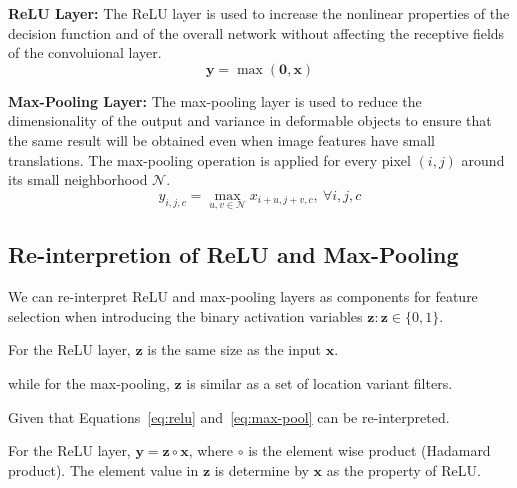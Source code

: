 \textbf{ReLU Layer:}
The ReLU layer is used to increase the nonlinear properties of the decision function and of the overall network without affecting the receptive fields of the convoluional layer.
\begin{equation}
\mathbf{y} = \max (\mathbf{0}, \mathbf{x})
\label{eq:relu}
\end{equation} 

\textbf{Max-Pooling Layer:}
The max-pooling layer is used to reduce the dimensionality of the output and variance in deformable objects to ensure that the same result will be obtained even when image features have small translations. The max-pooling operation is applied for every pixel $(i,j)$ around its small neighborhood $\mathcal{N}$.
\begin{equation}
y_{i,j,c} = \max_{u,v \in \mathcal{N}} x_{i+u, j+v, c},\ \forall i, j, c
\label{eq:max-pool}
\end{equation}

\subsection{Re-interpretion of ReLU and Max-Pooling}
We can re-interpret ReLU and max-pooling layers as components for feature selection when introducing the binary activation variables $\mathbf{z}: \mathbf{z} \in \{0, 1\}$. 

For the ReLU layer, $\mathbf{z}$ is the same size as the input $\mathbf{x}$. 

while for the max-pooling, $\mathbf{z}$ is similar as a set of location variant filters. 

Given that Equations~\ref{eq:relu} and~\ref{eq:max-pool} can be re-interpreted.

For the ReLU layer, $\mathbf{y} = \mathbf{z} \circ \mathbf{x}$, where $\circ$ is the element wise product (Hadamard product). The element value in $\mathbf{z}$ is determine by $\mathbf{x}$ as the property of ReLU.

